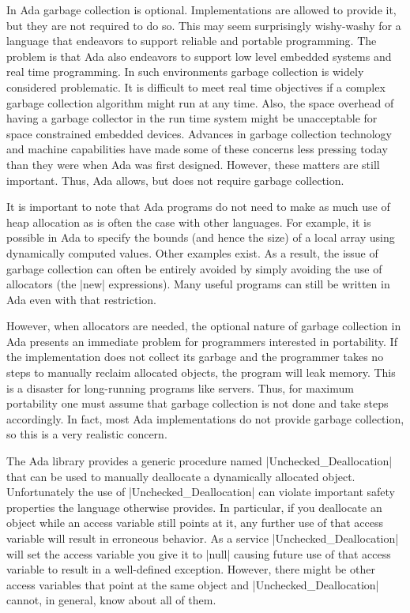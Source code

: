 In Ada garbage collection is optional. Implementations are allowed to provide it, but they are
not required to do so. This may seem surprisingly wishy-washy for a language that endeavors to
support reliable and portable programming. The problem is that Ada also endeavors to support low
level embedded systems and real time programming. In such environments garbage collection is
widely considered problematic. It is difficult to meet real time objectives if a complex garbage
collection algorithm might run at any time. Also, the space overhead of having a garbage
collector in the run time system might be unacceptable for space constrained embedded devices.
Advances in garbage collection technology and machine capabilities have made some of these
concerns less pressing today than they were when Ada was first designed. However, these matters
are still important. Thus, Ada allows, but does not require garbage collection.

It is important to note that Ada programs do not need to make as much use of heap allocation as
is often the case with other languages. For example, it is possible in Ada to specify the bounds
(and hence the size) of a local array using dynamically computed values. Other examples exist.
As a result, the issue of garbage collection can often be entirely avoided by simply avoiding
the use of allocators (the |new| expressions). Many useful programs can still be written in Ada
even with that restriction.

However, when allocators are needed, the optional nature of garbage collection in Ada presents
an immediate problem for programmers interested in portability. If the implementation does not
collect its garbage and the programmer takes no steps to manually reclaim allocated objects, the
program will leak memory. This is a disaster for long-running programs like servers. Thus, for
maximum portability one must assume that garbage collection is not done and take steps
accordingly. In fact, most Ada implementations do not provide garbage collection, so this is a
very realistic concern.

The Ada library provides a generic procedure named |Unchecked_Deallocation| that can be used to
manually deallocate a dynamically allocated object. Unfortunately the use of
|Unchecked_Deallocation| can violate important safety properties the language otherwise
provides. In particular, if you deallocate an object while an access variable still points at
it, any further use of that access variable will result in erroneous behavior. As a service
|Unchecked_Deallocation| will set the access variable you give it to |null| causing future use
of that access variable to result in a well-defined exception. However, there might be other
access variables that point at the same object and |Unchecked_Deallocation| cannot, in general,
know about all of them.

